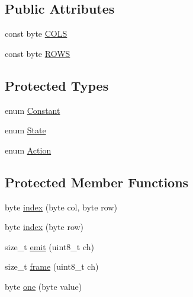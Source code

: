 \subsection*{Public Attributes}
\begin{DoxyCompactItemize}
\item 
\hypertarget{classcom_1_1diag_1_1amigo_1_1LC100Base_ae6afb224738640f518910b18b3da5d53}{
const byte \hyperlink{classcom_1_1diag_1_1amigo_1_1LC100Base_ae6afb224738640f518910b18b3da5d53}{COLS}}
\label{classcom_1_1diag_1_1amigo_1_1LC100Base_ae6afb224738640f518910b18b3da5d53}

\item 
\hypertarget{classcom_1_1diag_1_1amigo_1_1LC100Base_a863016b41914b002bd3d4e38486bdf0d}{
const byte \hyperlink{classcom_1_1diag_1_1amigo_1_1LC100Base_a863016b41914b002bd3d4e38486bdf0d}{ROWS}}
\label{classcom_1_1diag_1_1amigo_1_1LC100Base_a863016b41914b002bd3d4e38486bdf0d}

\end{DoxyCompactItemize}
\subsection*{Protected Types}
\begin{DoxyCompactItemize}
\item 
enum \hyperlink{classcom_1_1diag_1_1amigo_1_1LC100Base_a3a022c506359c0a939ed14e4fab577b8}{Constant} 
\item 
enum \hyperlink{classcom_1_1diag_1_1amigo_1_1LC100Base_a13ddf5295a1d05a7d2d939941ba7266e}{State} 
\item 
enum \hyperlink{classcom_1_1diag_1_1amigo_1_1LC100Base_afa1217f48472f7f6758733208ad14125}{Action} 
\end{DoxyCompactItemize}
\subsection*{Protected Member Functions}
\begin{DoxyCompactItemize}
\item 
byte \hyperlink{classcom_1_1diag_1_1amigo_1_1LC100Base_a01be594835cd4bef65fd611bb3e995be}{index} (byte col, byte row)
\item 
byte \hyperlink{classcom_1_1diag_1_1amigo_1_1LC100Base_a2fea6d0b46f653633fdf7677b6ce1f67}{index} (byte row)
\item 
size\_\-t \hyperlink{classcom_1_1diag_1_1amigo_1_1LC100Base_adad20089d65b5744e062a7b02fc14ef6}{emit} (uint8\_\-t ch)
\item 
size\_\-t \hyperlink{classcom_1_1diag_1_1amigo_1_1LC100Base_ae97773781b9decc7a4f6f08eb6ec5162}{frame} (uint8\_\-t ch)
\item 
byte \hyperlink{classcom_1_1diag_1_1amigo_1_1LC100Base_a8e2489e4637dd50cd06e6432c9b50fac}{one} (byte value)
\end{DoxyCompactItemize}


